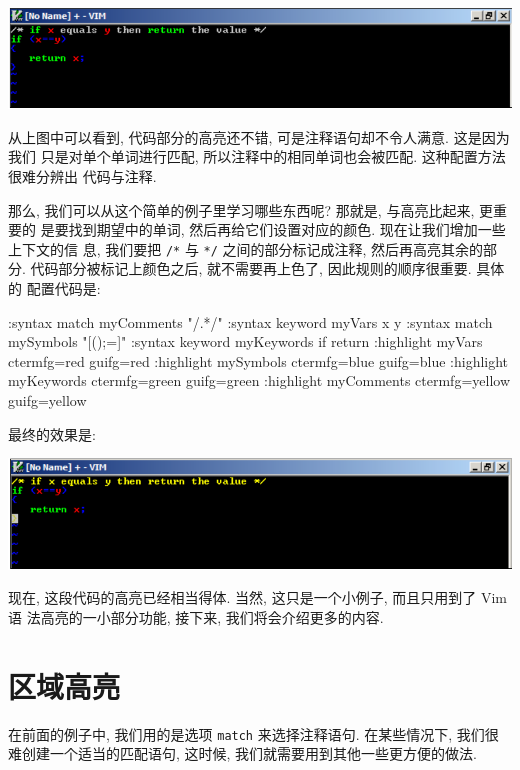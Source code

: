 \begin{center}
    \includegraphics[scale=0.5]{./images/page142.png}
\end{center}

从上图中可以看到, 代码部分的高亮还不错, 可是注释语句却不令人满意. 这是因为我们
只是对单个单词进行匹配, 所以注释中的相同单词也会被匹配. 这种配置方法很难分辨出
代码与注释.

那么, 我们可以从这个简单的例子里学习哪些东西呢? 那就是, 与高亮比起来, 更重要的
是要找到期望中的单词, 然后再给它们设置对应的颜色. 现在让我们增加一些上下文的信
息, 我们要把 \verb'/*' 与 \verb'*/' 之间的部分标记成注释, 然后再高亮其余的部
分. 代码部分被标记上颜色之后, 就不需要再上色了, 因此规则的顺序很重要. 具体的
配置代码是:
\begin{vimcode}
:syntax match myComments "/\*.*\*/"
:syntax keyword myVars x y
:syntax match mySymbols "[{}();=]"
:syntax keyword myKeywords if return
:highlight myVars ctermfg=red guifg=red
:highlight mySymbols ctermfg=blue guifg=blue
:highlight myKeywords ctermfg=green guifg=green
:highlight myComments ctermfg=yellow guifg=yellow
\end{vimcode}
最终的效果是:
\begin{center}
\includegraphics[scale=0.6]{./images/page143.png}
\end{center}

现在, 这段代码的高亮已经相当得体. 当然, 这只是一个小例子, 而且只用到了 Vim 语
法高亮的一小部分功能, 接下来, 我们将会介绍更多的内容.

\section{区域高亮}
\label{sec:syntax_regions}

在前面的例子中, 我们用的是选项 \texttt{match} 来选择注释语句. 在某些情况下,
我们很难创建一个适当的匹配语句, 这时候, 我们就需要用到其他一些更方便的做法.

